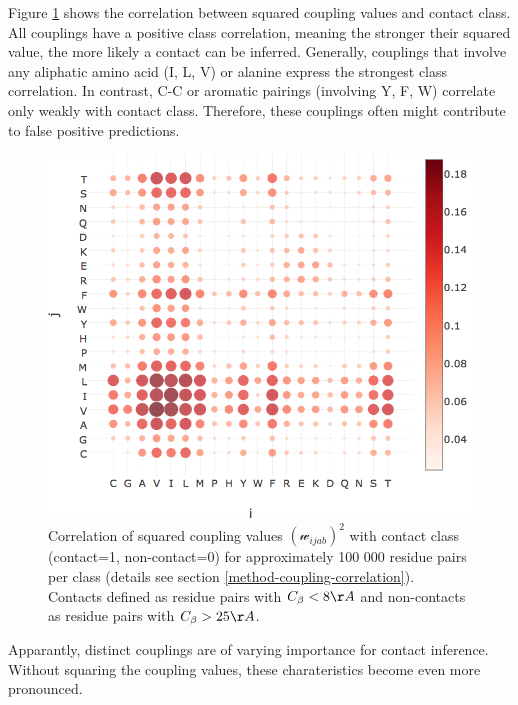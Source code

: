 \documentclass[12pt,a4paper,twoside]{book}
\newcommand{\Cb}{C_\beta}
\newcommand{\wijab}{\mathcal{w}_{ijab}}
\theoremstyle{definition}
\theoremstyle{definition}
\theoremstyle{remark}
\begin{document}
Figure \ref{fig:sq-coupling-correlation} shows the correlation between
squared coupling values and contact class. All couplings have a positive
class correlation, meaning the stronger their squared value, the more
likely a contact can be inferred. Generally, couplings that involve any
aliphatic amino acid (I, L, V) or alanine express the strongest class
correlation. In contrast, C-C or aromatic pairings (involving Y, F, W)
correlate only weakly with contact class. Therefore, these couplings
often might contribute to false positive predictions.








\begin{figure}

{\centering \includegraphics[width=0.9\linewidth]{img/coupling_matrix_analysis/correlation_squared_couplings_with_contact_class_notitle} 

}

\caption{Correlation of squared coupling values
\((\wijab)^2\) with contact class (contact=1, non-contact=0) for
approximately 100 000 residue pairs per class (details see section
\ref{method-coupling-correlation}). Contacts defined as residue pairs
with \(\Cb < 8 \AA\) and non-contacts as residue pairs with
\(\Cb > 25 \AA\).}\label{fig:sq-coupling-correlation}
\end{figure}

Apparantly, distinct couplings are of varying importance for contact
inference. Without squaring the coupling values, these charateristics
become even more pronounced.
\end{document}
